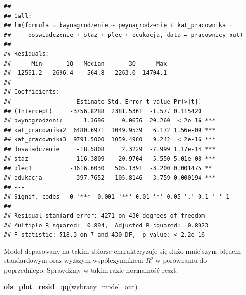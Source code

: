 \documentclass[]{book}
\newenvironment{Shaded}{\begin{snugshade}}{\end{snugshade}}
\newcommand{\DataTypeTok}[1]{\textcolor[rgb]{0.13,0.29,0.53}{#1}}
\newcommand{\KeywordTok}[1]{\textcolor[rgb]{0.13,0.29,0.53}{\textbf{#1}}}
\newcommand{\NormalTok}[1]{#1}
\newcommand{\OperatorTok}[1]{\textcolor[rgb]{0.81,0.36,0.00}{\textbf{#1}}}
\newcommand{\StringTok}[1]{\textcolor[rgb]{0.31,0.60,0.02}{#1}}
\begin{document}
\begin{Shaded}
\end{Shaded}

\begin{verbatim}
## 
## Call:
## lm(formula = bwynagrodzenie ~ pwynagrodzenie + kat_pracownika + 
##     doswiadczenie + staz + plec + edukacja, data = pracownicy_out)
## 
## Residuals:
##      Min       1Q   Median       3Q      Max 
## -12591.2  -2696.4   -564.8   2263.0  14704.1 
## 
## Coefficients:
##                   Estimate Std. Error t value Pr(>|t|)    
## (Intercept)     -3756.8288  2381.5361  -1.577 0.115420    
## pwynagrodzenie      1.3696     0.0676  20.260  < 2e-16 ***
## kat_pracownika2  6480.6971  1049.9539   6.172 1.56e-09 ***
## kat_pracownika3  9791.5000  1059.4980   9.242  < 2e-16 ***
## doswiadczenie     -18.5808     2.3229  -7.999 1.17e-14 ***
## staz              116.3809    20.9704   5.550 5.01e-08 ***
## plec1           -1616.6030   505.1391  -3.200 0.001475 ** 
## edukacja          397.7652   105.8146   3.759 0.000194 ***
## ---
## Signif. codes:  0 '***' 0.001 '**' 0.01 '*' 0.05 '.' 0.1 ' ' 1
## 
## Residual standard error: 4271 on 430 degrees of freedom
## Multiple R-squared:  0.894,  Adjusted R-squared:  0.8923 
## F-statistic: 518.3 on 7 and 430 DF,  p-value: < 2.2e-16
\end{verbatim}

Model dopasowany na takim zbiorze charakteryzuje się dużo mniejszym błędem standardowym oraz wyższym współczynnikiem \(R^2\) w porównaniu do poprzedniego. Sprawdźmy w takim razie normalność reszt.

\begin{Shaded}
\begin{Highlighting}[]
\KeywordTok{ols_plot_resid_qq}\NormalTok{(wybrany_model_out)}
\end{Highlighting}
\end{Shaded}
\end{document}
